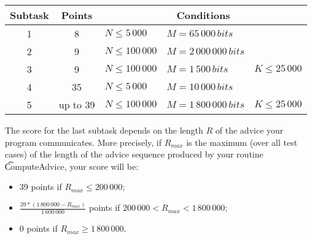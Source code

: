 \begin{tabular}{|c|c|lll|}
\hline
\bf{Subtask}&\bf{Points}&\multicolumn{3}{c|}{\bf{Conditions}}\\\hline
1 & 8 & $N \le 5\,000$ & $M = 65\,000\,bits$&\\\hline
2 & 9 & $N \le 100\,000$ & $M = 2\,000\,000\,bits$&\\\hline
3 & 9 & $N \le 100\,000$ & $M = 1\,500\,bits$ & $K \le 25\,000$\\\hline
4 & 35 & $N \le 5\,000$ & $M = 10\,000\,bits$&\\\hline
5 & up to 39 & $N \le 100\,000$ & $M = 1\,800\,000\,bits$ & $K \le 25\,000$\\\hline
\end{tabular}

The score for the last subtask depends on the length $R$ of the advice your program communicates. More precisely, if $R_{max}$ is the maximum (over all test cases) of the length of the advice sequence produced by your routine \t{ComputeAdvice}, your score will be:
\begin{itemize}
\item $39$ points if $R_{max} \le 200\,000$;
\item $\frac{39*(1\,800\,000 - R_{max})}{1\,600\,000}$ points if $200\,000 < R_{max} < 1\,800\,000$;
\item $0$ points if $R_{max} \geq 1\,800\,000$.
\end{itemize}